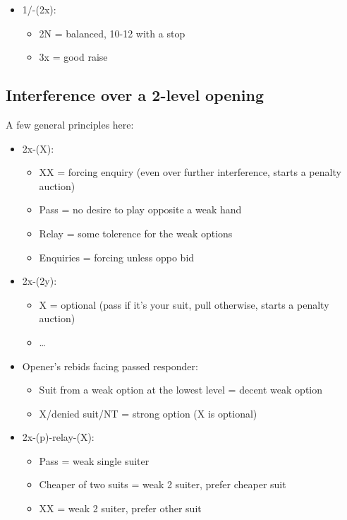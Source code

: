 \documentclass[a4paper,14pt]{extarticle}
\begin{document}
\begin{itemize}
\item 1\hearts/\spades-(2x):
	\begin{itemize}
	\item 2N = balanced, 10-12 with a stop
	\item 3x = good raise
	\end{itemize}
	 
\end{itemize}


\subsection{Interference over a 2-level opening}
\label{sec:intf:2level}

A few general principles here:

\begin{itemize}
\item 2x-(X):
   \begin{itemize}
      \item XX = forcing enquiry (even over further interference, starts a penalty auction)
      \item Pass = no desire to play opposite a weak hand
      \item Relay = some tolerence for the weak options
      \item Enquiries = forcing unless oppo bid
   \end{itemize}
\newpage
\item 2x-(2y):
   \begin{itemize}
      \item X = optional (pass if it's your suit, pull otherwise, starts a penalty auction)
      \item \ldots
   \end{itemize}
\item Opener's rebids facing passed responder:
   \begin{itemize}
   \item Suit from a weak option at the lowest level = decent weak option
   \item X/denied suit/NT = strong option (X is optional)
   \end{itemize}
\item 2x-(p)-relay-(X):
   \begin{itemize}
	\item Pass = weak single suiter
	\item Cheaper of two suits = weak 2 suiter, prefer cheaper suit
	\item XX = weak 2 suiter, prefer other suit

\end{itemize}
\end{itemize}
\end{document}
